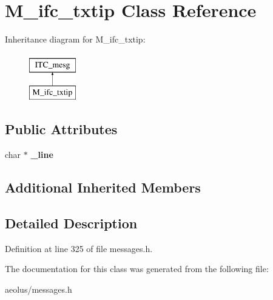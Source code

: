\hypertarget{class_m__ifc__txtip}{}\section{M\+\_\+ifc\+\_\+txtip Class Reference}
\label{class_m__ifc__txtip}
Inheritance diagram for M\+\_\+ifc\+\_\+txtip\+:\begin{figure}[H]
\begin{center}
\leavevmode
\includegraphics[height=2.000000cm]{class_m__ifc__txtip}
\end{center}
\end{figure}
\subsection*{Public Attributes}
\begin{DoxyCompactItemize}
\item 
\mbox{\label{class_m__ifc__txtip_ac5899c80fe7f82b8f959af276e465c62}} 
char $\ast$ {\bfseries \+\_\+line}
\end{DoxyCompactItemize}
\subsection*{Additional Inherited Members}


\subsection{Detailed Description}


Definition at line 325 of file messages.\+h.



The documentation for this class was generated from the following file\+:\begin{DoxyCompactItemize}
\item 
aeolus/messages.\+h\end{DoxyCompactItemize}
